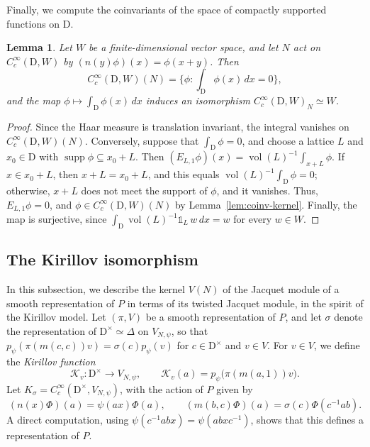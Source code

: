 \documentclass[11pt]{amsart}
\numberwithin{equation}{section}
\theoremstyle{plain}
\newtheorem{lemma}[theorem]{Lemma}
\theoremstyle{definition}
\theoremstyle{remark}
\newcommand{\one}{\mathds{1}}
\DeclareMathOperator{\vol}{vol}
\newcommand{\Kir}{\mathcal{K}}
\begin{document}
Finally, we compute the coinvariants of the space of compactly supported functions on $\mathrm{D}$.

\begin{lemma}\label{lem:coinv-Cc}
	Let $W$ be a finite-dimensional vector space, and let $N$ act on $C_c^\infty(\mathrm{D},W)$ by $(n(y)\phi)(x)=\phi(x+y)$. Then
	$$C_c^\infty(\mathrm{D},W)(N)=\Big\{\phi:\int_{\mathrm{D}}\phi(x)\,dx=0\Big\},$$
	and the map $\phi\mapsto\int_{\mathrm{D}}\phi(x)\,dx$ induces an isomorphism $C_c^\infty(\mathrm{D},W)_N\simeq W$.
\end{lemma}

\begin{proof}
	Since the Haar measure is translation invariant, the integral vanishes on $C_c^\infty(\mathrm{D},W)(N)$. Conversely, suppose that $\int_{\mathrm{D}}\phi=0$, and choose a lattice $L$ and $x_0\in \mathrm{D}$ with $\operatorname{supp}\phi\subseteq x_0+L$. Then $(E_{L,1}\phi)(x)=\vol(L)^{-1}\int_{x+L}\phi$. If $x\in x_0+L$, then $x+L=x_0+L$, and this equals $\vol(L)^{-1}\int_{\mathrm{D}}\phi=0$; otherwise, $x+L$ does not meet the support of $\phi$, and it vanishes. Thus, $E_{L,1}\phi=0$, and $\phi\in C_c^\infty(\mathrm{D},W)(N)$ by Lemma~\ref{lem:coinv-kernel}. Finally, the map is surjective, since $\int_{\mathrm{D}}\vol(L)^{-1}\one_L\,w\,dx=w$ for every $w\in W$.
\end{proof}

\subsection{The Kirillov isomorphism}\label{ss:kirillov}

In this subsection, we describe the kernel $V(N)$ of the Jacquet module of a smooth representation of $P$ in terms of its twisted Jacquet module, in the spirit of the Kirillov model. Let $(\pi,V)$ be a smooth representation of $P$, and let $\sigma$ denote the representation of $\mathrm{D}^\times\simeq\Delta$ on $V_{N,\psi}$, so that $p_\psi(\pi(m(c,c))v)=\sigma(c)p_\psi(v)$ for $c\in\mathrm{D}^\times$ and $v\in V$. For $v\in V$, we define the \emph{Kirillov function}
$$\Kir_v\colon \mathrm{D}^\times\to V_{N,\psi},\qquad\Kir_v(a)=p_\psi\big(\pi(m(a,1))v\big).$$
Let $K_\sigma=C_c^\infty(\mathrm{D}^\times,V_{N,\psi})$, with the action of $P$ given by
\begin{equation}\label{eq:kirillov-action}
	(n(x)\Phi)(a)=\psi(ax)\Phi(a),\qquad(m(b,c)\Phi)(a)=\sigma(c)\Phi(c^{-1}ab).
\end{equation}
A direct computation, using $\psi(c^{-1}abx)=\psi(abxc^{-1})$, shows that this defines a representation of $P$.
\end{document}
